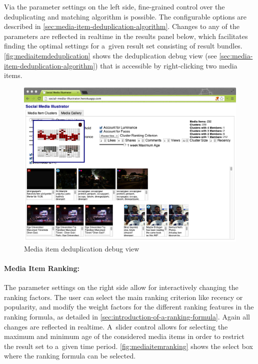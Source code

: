 Via the parameter settings on the left side,
fine-grained control over the deduplicating
and matching algorithm is possible.
The configurable options are described in \autoref{sec:media-item-deduplication-algorithm}.
Changes to any of the parameters are reflected in realtime
in the results panel below, which facilitates finding the optimal
settings for a~given result set consisting of result bundles.
\autoref{fig:mediaitemdeduplication} shows the deduplication debug view (see \autoref{sec:media-item-deduplication-algorithm})
that is accessible by right-clicking two media items.

\begin{figure}[!ht]
  \centering
  \includegraphics[width=1\columnwidth]{app2.png}
  \caption{Media item deduplication debug view}
  \label{fig:mediaitemdeduplication}
\end{figure}

\paragraph{Media Item Ranking:}

The parameter settings on the right side
allow for interactively changing the ranking factors.
The user can select the main ranking criterion like recency or popularity, and modify the weight factors
for the different ranking features in the ranking formula,
as detailed in \autoref{sec:introduction-of-a-ranking-formula}.
Again all changes are reflected in realtime.
A~slider control allows for selecting the maximum
and minimum age of the considered media items
in order to restrict the result set to a~given time period.
\autoref{fig:mediaitemranking} shows the select box
where the ranking formula can be selected.

